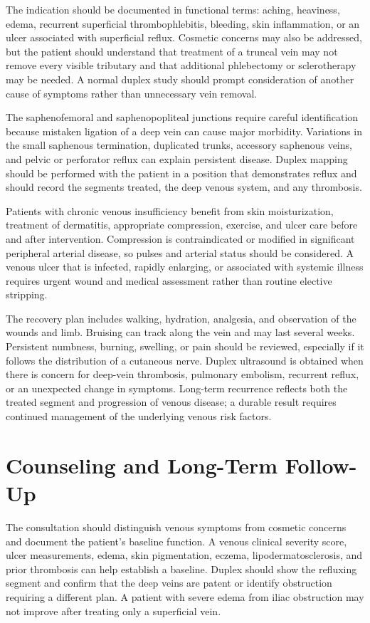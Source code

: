 The indication should be documented in functional terms: aching, heaviness, edema, recurrent superficial thrombophlebitis, bleeding, skin inflammation, or an ulcer associated with superficial reflux. Cosmetic concerns may also be addressed, but the patient should understand that treatment of a truncal vein may not remove every visible tributary and that additional phlebectomy or sclerotherapy may be needed. A normal duplex study should prompt consideration of another cause of symptoms rather than unnecessary vein removal.

The saphenofemoral and saphenopopliteal junctions require careful identification because mistaken ligation of a deep vein can cause major morbidity. Variations in the small saphenous termination, duplicated trunks, accessory saphenous veins, and pelvic or perforator reflux can explain persistent disease. Duplex mapping should be performed with the patient in a position that demonstrates reflux and should record the segments treated, the deep venous system, and any thrombosis.

Patients with chronic venous insufficiency benefit from skin moisturization, treatment of dermatitis, appropriate compression, exercise, and ulcer care before and after intervention. Compression is contraindicated or modified in significant peripheral arterial disease, so pulses and arterial status should be considered. A venous ulcer that is infected, rapidly enlarging, or associated with systemic illness requires urgent wound and medical assessment rather than routine elective stripping.

The recovery plan includes walking, hydration, analgesia, and observation of the wounds and limb. Bruising can track along the vein and may last several weeks. Persistent numbness, burning, swelling, or pain should be reviewed, especially if it follows the distribution of a cutaneous nerve. Duplex ultrasound is obtained when there is concern for deep-vein thrombosis, pulmonary embolism, recurrent reflux, or an unexpected change in symptoms. Long-term recurrence reflects both the treated segment and progression of venous disease; a durable result requires continued management of the underlying venous risk factors.

\section*{Counseling and Long-Term Follow-Up}
The consultation should distinguish venous symptoms from cosmetic concerns and document the patient's baseline function. A venous clinical severity score, ulcer measurements, edema, skin pigmentation, eczema, lipodermatosclerosis, and prior thrombosis can help establish a baseline. Duplex should show the refluxing segment and confirm that the deep veins are patent or identify obstruction requiring a different plan. A patient with severe edema from iliac obstruction may not improve after treating only a superficial vein.

